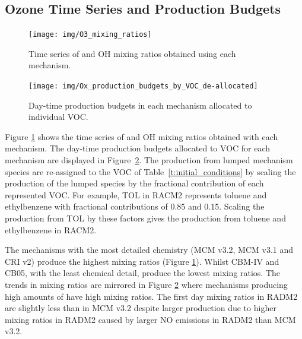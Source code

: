 %
\subsection[O3 Time Series and Ox Production Budgets]{Ozone Time Series and  Production Budgets} \label{ss:O3_time_series}

\begin{figure}
    \centering
    \texttt{[image: img/O3\_mixing\_ratios]}
    \vspace{1mm}
    \caption{Time series of  and OH mixing ratios obtained using each mechanism.}
    \vspace{-4mm}
    \label{f:time_series}
\end{figure}

\begin{figure}
    \centering
    \texttt{[image: img/Ox\_production\_budgets\_by\_VOC\_de-allocated]}
    \vspace{1mm}
    \caption{Day-time  production budgets in each mechanism allocated to individual VOC.}
    \vspace{-4mm}
    \label{f:Ox_tagged_budgets}
\end{figure}

Figure \ref{f:time_series} shows the time series of  and OH mixing ratios obtained with each mechanism.
The day-time  production budgets allocated to VOC for each mechanism are displayed in \mbox{Figure \ref{f:Ox_tagged_budgets}}.
The  production from lumped mechanism species are re-assigned to the VOC of \mbox{Table \ref{t:initial_conditions}} by scaling the  production of the lumped species by the fractional contribution of each represented VOC.
For example, TOL in RACM2 represents toluene and ethylbenzene with fractional contributions of $0.85$ and $0.15$.
Scaling the  production from TOL by these factors gives the  production from toluene and ethylbenzene in RACM2.

The mechanisms with the most detailed chemistry (MCM v3.2, MCM v3.1 and CRI v2) produce the highest  mixing ratios (Figure \ref{f:time_series}).
Whilst CBM-IV and CB05, with the least chemical detail, produce the lowest  mixing ratios.
The trends in  mixing ratios are mirrored in Figure \ref{f:Ox_tagged_budgets} where mechanisms producing high amounts of  have high  mixing ratios.
The first day  mixing ratios in RADM2 are slightly less than in MCM v3.2 despite larger  production due to higher  mixing ratios in RADM2 caused by larger NO emissions in RADM2 than MCM v3.2.

